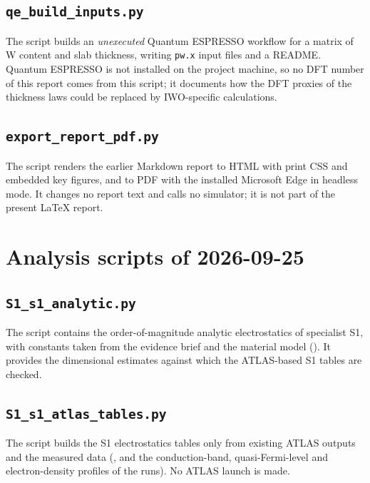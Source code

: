 \subsection{\texttt{qe\_build\_inputs.py}}
The script builds an \emph{unexecuted} Quantum ESPRESSO workflow \citep[p.~1]{Giannozzi2009} for a matrix of W content
and slab thickness, writing \texttt{pw.x} input files and a README. Quantum ESPRESSO is not installed on the project
machine, so no DFT number of this report comes from this script; it documents how the DFT proxies of the thickness laws
could be replaced by IWO-specific calculations.


\subsection{\texttt{export\_report\_pdf.py}}
The script renders the earlier Markdown report  to HTML with print CSS and embedded key
figures, and to PDF with the installed Microsoft Edge in headless mode. It changes no report text and calls no
simulator; it is not part of the present \LaTeX{} report.


\section{Analysis scripts of 2026-09-25}\label{sec:code-analysis}

\subsection{\texttt{S1\_s1\_analytic.py}}
The script contains the order-of-magnitude analytic electrostatics of specialist S1, with constants taken from the
evidence brief and the material model (\evTHEORY). It provides the dimensional estimates against which the ATLAS-based
S1 tables are checked.


\subsection{\texttt{S1\_s1\_atlas\_tables.py}}
The script builds the S1 electrostatics tables only from existing ATLAS outputs and the measured data
(,  and the conduction-band, quasi-Fermi-level and electron-density profiles of
the runs). No ATLAS launch is made.


